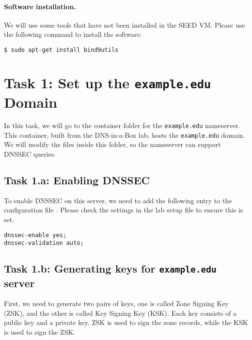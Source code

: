 \paragraph{Software installation.} We will use some tools that 
have not been installed in the SEED VM. Please use the following
command to install the software: 

\begin{lstlisting}
$ sudo apt-get install bind9utils
\end{lstlisting}
 


\section{Task 1: Set up the \texttt{example.edu} Domain}


In this task, we will go to the container folder for the 
\texttt{example.edu} nameserver. This container, built 
from the DNS-in-a-Box lab, hosts 
the \texttt{example.edu} domain. 
We will modify the files inside this folder, so the nameserver
can support DNSSEC queries. 



\subsection{Task 1.a: Enabling DNSSEC}

To enable DNSSEC on this server, we need to add the following entry to the 
configuration file . Please check the settings
in the lab setup file to ensure this is set. 

\begin{lstlisting}
dnssec-enable yes;
dnssec-validation auto;
\end{lstlisting}



\subsection{Task 1.b: Generating keys for \texttt{example.edu} server} 

First, we need to generate two pairs of keys, one is called Zone Signing Key (ZSK), and 
the other is called Key Signing Key (KSK). Each key consists of a public key and a private key.
ZSK is used to sign the zone records, while the KSK is used to sign the ZSK. 

